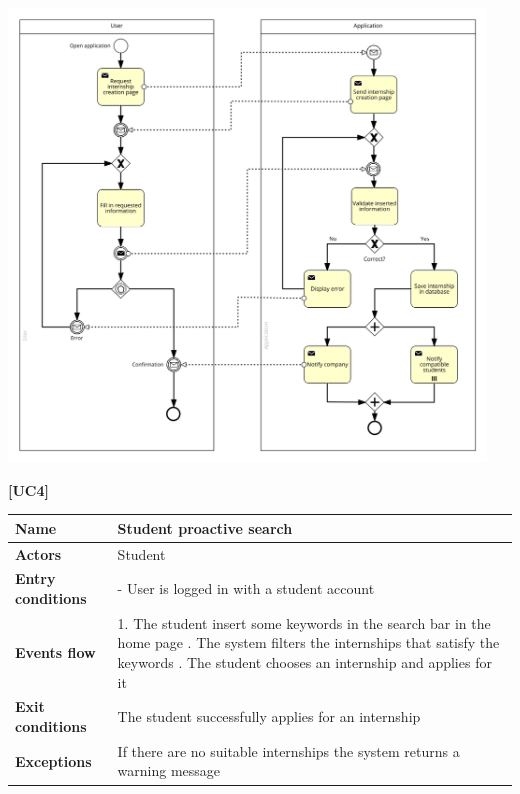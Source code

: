 \documentclass[11pt,twoside]{article}
\begin{document}
\begin{center}
\includegraphics[width=0.95\textwidth]{Images/UC3}
\end{center}

\newpage

\large{\textbf{[UC4]}} \\
\begin{table}[H]
\begin{tabular}{| p{} | p{} |}
\hline
\textbf{Name}
& Student proactive search \\
\hline
\textbf{Actors}
& Student \\
\hline
\textbf{Entry conditions}
& - User is logged in with a student account \\
\hline
\textbf{Events flow}
& 1. The student insert some keywords in the search bar in the home page \newline
2. The system filters the internships that satisfy the keywords \newline
3. The student chooses an internship and applies for it \\
\hline
\textbf{Exit conditions}
& The student successfully applies for an internship \\
\hline
\textbf{Exceptions}
& If there are no suitable internships the system returns a warning message \\
\hline
\end{tabular}
\end{table}
\end{document}
